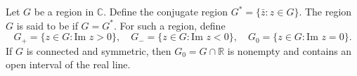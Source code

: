 Let $G$ be a region in $\mathbb{C}$. Define the conjugate region $G^* = \{\bar{z} : z \in G\}$. The region $G$ is said to be  if $G = G^*$. For such a region, define
$$G_+ = \{z \in G : \text{Im } z > 0\}, \quad G_- = \{z \in G : \text{Im } z < 0\}, \quad G_0 = \{z \in G : \text{Im } z = 0\}.$$
If $G$ is connected and symmetric, then $G_0 = G \cap \mathbb{R}$ is nonempty and contains an open interval of the real line.
